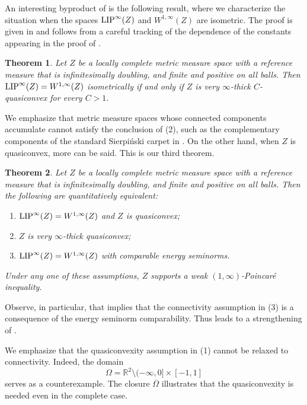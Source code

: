 \documentclass[reqno]{amsart}
\newcommand{\LIP}{{\rm LIP}}
\numberwithin{equation}{section}
\newtheorem{theorem}{Theorem}[section]
\theoremstyle{remark}
\newcommand{\R}{\mathbb{R}}
\begin{document}
An interesting byproduct of  is the following result, where we characterize the situation when the spaces $\LIP^{\infty}(Z)$ and $ W^{1,\infty}(Z)$ are isometric. The proof is given in  and follows from a careful tracking of the dependence of the constants appearing in the proof of .  
\begin{theorem}\label{prop:sharpness}
Let $Z$ be a locally complete metric measure space with a reference measure that is infinitesimally doubling, and finite and positive on all balls. Then $\LIP^{\infty}(Z) = W^{1,\infty}(Z)$ isometrically if and only if $Z$ is very $\infty$-thick $C$-quasiconvex for every $C>1$.
\end{theorem}

We emphasize that metric measure spaces whose connected components accumulate cannot satisfy the conclusion of  (2), such as the complementary components of the standard Sierpi\'nski carpet in . On the other hand, when $Z$ is quasiconvex, more can be said. This is our  third theorem.

\begin{theorem}\label{thm:bounded:doubling}
Let $Z$ be a locally complete metric measure space with a reference measure that is infinitesimally doubling, and finite and positive on all balls. Then the following are quantitatively equivalent:
\begin{enumerate}
    \item $\LIP^{\infty}(Z) = W^{1,\infty}(Z)$ and $Z$ is quasiconvex;
    \item $Z$ is very $\infty$-thick quasiconvex;
    \item $\LIP^{\infty}(Z) = W^{1,\infty}(Z)$ with comparable energy seminorms.
\end{enumerate}
Under any one of these assumptions, $Z$ supports a weak $(1,\infty)$-Poincaré inequality.
\end{theorem}
Observe, in particular, that  implies that the connectivity assumption in  (3) is a consequence of the energy seminorm comparability. Thus  leads to a strengthening of .

We emphasize that the quasiconvexity assumption in  (1) cannot be relaxed to connectivity. Indeed, the domain
\begin{equation}\label{eq:nonquasiconvexdomain}
    \Omega=\R^2 \setminus (-\infty,0] \times [-1,1]
\end{equation}
serves as a counterexample. The closure $\overline{\Omega}$ illustrates that the quasiconvexity is needed even in the complete case. 
\end{document}
